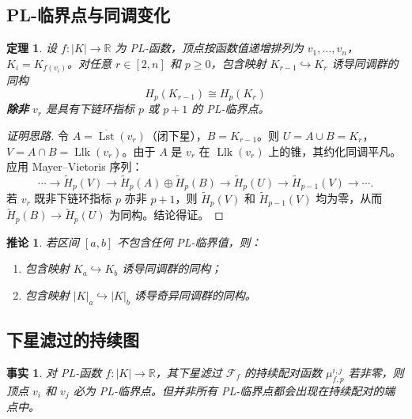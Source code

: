 \documentclass[UTF8]{ctexart}
\newtheorem{fact}[definition]{事实}
\newtheorem{theorem}[definition]{定理}
\newtheorem{corollary}[definition]{推论}
\begin{document}
\subsection{PL-临界点与同调变化}
\label{subsec:pl-critical-homology}

\begin{theorem}
\label{thm:pl-critical-change}
设 \(f: |K| \to \mathbb{R}\) 为 PL-函数，顶点按函数值递增排列为 \(v_1,\dots,v_n\)，\(K_i = K_{f(v_i)}\)。对任意 \(r \in [2,n]\) 和 \(p \ge 0\)，包含映射 \(K_{r-1} \hookrightarrow K_r\) 诱导同调群的同构
\[
H_p(K_{r-1}) \cong H_p(K_r)
\]
\textbf{除非} \(v_r\) 是具有下链环指标 \(p\) 或 \(p+1\) 的 PL-临界点。
\end{theorem}

\begin{proof}[证明思路]
令 \(A = \overline{\operatorname{Lst}}(v_r)\)（闭下星），\(B = K_{r-1}\)。则 \(U = A \cup B = K_r\)，\(V = A \cap B = \operatorname{Llk}(v_r)\)。由于 \(A\) 是 \(v_r\) 在 \(\operatorname{Llk}(v_r)\) 上的锥，其约化同调平凡。应用 Mayer–Vietoris 序列：
\[
\cdots \to \tilde{H}_p(V) \to \tilde{H}_p(A) \oplus \tilde{H}_p(B) \to \tilde{H}_p(U) \to \tilde{H}_{p-1}(V) \to \cdots.
\]
若 \(v_r\) 既非下链环指标 \(p\) 亦非 \(p+1\)，则 \(\tilde{H}_p(V)\) 和 \(\tilde{H}_{p-1}(V)\) 均为零，从而 \(\tilde{H}_p(B) \to \tilde{H}_p(U)\) 为同构。结论得证。
\end{proof}

\begin{corollary}
\label{cor:pl-critical-interval}
若区间 \([a,b]\) 不包含任何 PL-临界值，则：
\begin{enumerate}
    \item 包含映射 \(K_a \hookrightarrow K_b\) 诱导同调群的同构；
    \item 包含映射 \(|K|_a \hookrightarrow |K|_b\) 诱导奇异同调群的同构。
\end{enumerate}
\end{corollary}

\subsection{下星滤过的持续图}
\label{subsec:lower-star-persistence}

\begin{fact}
\label{fact:pl-persistence-pairs}
对 PL-函数 \(f: |K| \to \mathbb{R}\)，其下星滤过 \(\mathcal{F}_f\) 的持续配对函数 \(\mu_{f,p}^{i,j}\) 若非零，则顶点 \(v_i\) 和 \(v_j\) 必为 PL-临界点。但并非所有 PL-临界点都会出现在持续配对的端点中。
\end{fact}
\end{document}
